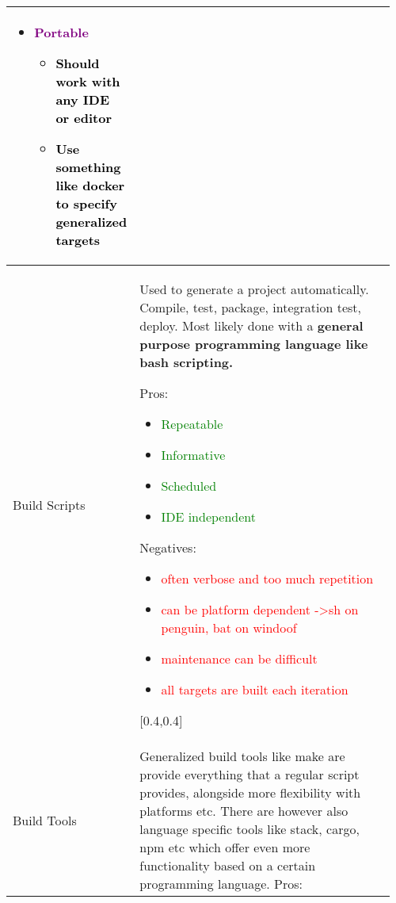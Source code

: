 \documentclass[main.tex,fontsize=8pt,paper=a4,paper=portrait,DIV=calc,]{scrartcl}
\begin{document}
\begin{table}[ht!]
\begin{tabular}{|m{0.2\linewidth}|m{0.755\linewidth}|}
\begin{itemize}
\begin{itemize}
\end{itemize}
\item \textcolor{purple}{Portable}\newline
\begin{itemize}
  \item \textcolor{black}{Should work with any IDE or editor}
  \item \textcolor{black}{Use something like docker to specify generalized targets}
\end{itemize}
\vspace{-3mm}
\end{itemize} \\
\hline
Build Scripts & 
Used to generate a project automatically. Compile, test, package, integration test, deploy. \newline
Most likely done with a \textbf{general purpose programming language like \textbf{bash scripting}.}\newline
\minipg{
Pros: \newline
\begin{itemize}
\item \textcolor{green}{Repeatable}
\item \textcolor{green}{Informative}
\item \textcolor{green}{Scheduled}
\item \textcolor{green}{IDE independent}
\end{itemize} 
}{
Negatives:\newline
\begin{itemize}
\item \textcolor{red}{often verbose and too much repetition}
\item \textcolor{red}{can be platform dependent ->sh on penguin, bat on windoof}
\item \textcolor{red}{maintenance can be difficult}
\item \textcolor{red}{all targets are built each iteration}
\vspace{-3mm}
\end{itemize} 
}[0.4,0.4]\\
\hline
Build Tools & 
Generalized build tools like make are provide everything that a regular script provides, alongside more flexibility with platforms etc.\newline
There are however also language specific tools like stack, cargo, npm etc which offer even more functionality based on a certain programming language.\newline
Pros:\newline

\end{tabular}
\end{table}
\end{document}

